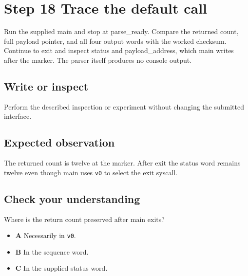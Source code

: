 \section{Step 18 Trace the default call}\label{packet-s18}

Run the supplied main and stop at parse\_ready. Compare the returned count, full payload pointer, and all four output words with the worked checksum. Continue to exit and inspect status and payload\_address, which main writes after the marker. The parser itself produces no console output.

\subsection{Write or inspect}
Perform the described inspection or experiment without changing the submitted interface.

\subsection{Expected observation}
The returned count is twelve at the marker. After exit the status word remains twelve even though main uses \texttt{v0} to select the exit syscall.

\subsection{Check your understanding}
Where is the return count preserved after main exits?

\begin{itemize}
  \item \textbf{A} Necessarily in \texttt{v0}.
  \item \textbf{B} In the sequence word.
  \item \textbf{C} In the supplied status word.
\end{itemize}
